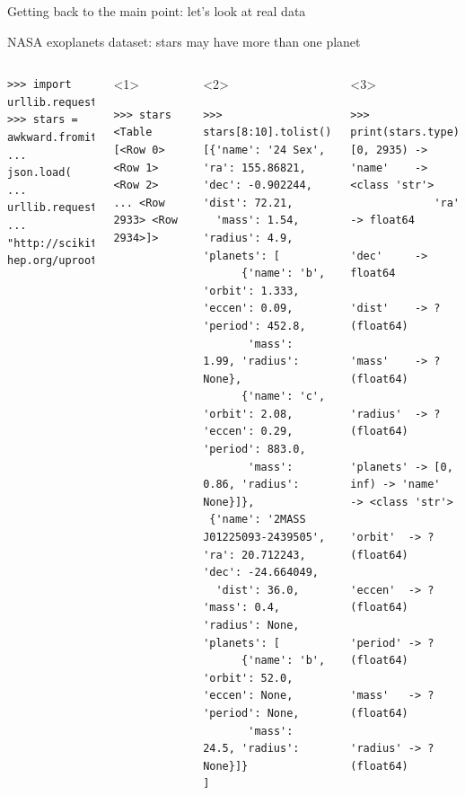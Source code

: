 \documentclass[aspectratio=169]{beamer}
\begin{document}
\begin{frame}{}
\LARGE
\vspace{1 cm}
\begin{center}
Getting back to the main point: let's look at real data
\end{center}
\end{frame}

\begin{frame}[fragile]{NASA exoplanets dataset: stars may have more than one planet}
\begin{columns}
\small
\begin{verbatim}
>>> import urllib.request
>>> stars = awkward.fromiter(
...     json.load(
...         urllib.request.urlopen(
...            "http://scikit-hep.org/uproot/examples/exoplanets.json")))
\end{verbatim}

\begin{onlyenv}<1>
\begin{verbatim}
>>> stars
<Table [<Row 0> <Row 1> <Row 2> ... <Row 2933> <Row 2934>]>
\end{verbatim}

\vspace{10 cm}
\end{onlyenv}
\begin{onlyenv}<2>
\begin{verbatim}
>>> stars[8:10].tolist()
[{'name': '24 Sex', 'ra': 155.86821, 'dec': -0.902244, 'dist': 72.21,
  'mass': 1.54, 'radius': 4.9, 'planets': [
      {'name': 'b', 'orbit': 1.333, 'eccen': 0.09, 'period': 452.8,
       'mass': 1.99, 'radius': None},
      {'name': 'c', 'orbit': 2.08, 'eccen': 0.29, 'period': 883.0,
       'mass': 0.86, 'radius': None}]},
 {'name': '2MASS J01225093-2439505', 'ra': 20.712243, 'dec': -24.664049,
  'dist': 36.0, 'mass': 0.4, 'radius': None, 'planets': [
      {'name': 'b', 'orbit': 52.0, 'eccen': None, 'period': None,
       'mass': 24.5, 'radius': None}]}
]
\end{verbatim}

\vspace{10 cm}
\end{onlyenv}
\begin{onlyenv}<3>
\small
\vspace{-0.6 cm}
\begin{verbatim}
>>> print(stars.type)
[0, 2935) -> 'name'    -> <class 'str'>
             'ra'      -> float64
             'dec'     -> float64
             'dist'    -> ?(float64)
             'mass'    -> ?(float64)
             'radius'  -> ?(float64)
             'planets' -> [0, inf) -> 'name'   -> <class 'str'>
                                      'orbit'  -> ?(float64)
                                      'eccen'  -> ?(float64)
                                      'period' -> ?(float64)
                                      'mass'   -> ?(float64)
                                      'radius' -> ?(float64)
\end{verbatim}


\end{onlyenv}
\end{columns}
\end{frame}
\end{document}
